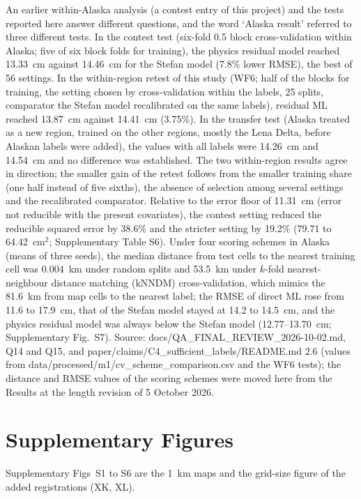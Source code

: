 An earlier within-Alaska analysis (a contest entry of this project) and the tests reported here answer different questions, and the word `Alaska result' referred to three different tests. In the contest test (six-fold 0.5\textdegree{} block cross-validation within Alaska; five of six block folds for training), the physics residual model reached 13.33~cm against 14.46~cm for the Stefan model (7.8\% lower RMSE), the best of 56 settings. In the within-region retest of this study (WF6; half of the blocks for training, the setting chosen by cross-validation within the labels, 25 splits, comparator the Stefan model recalibrated on the same labels), residual ML reached 13.87~cm against 14.41~cm (3.75\%). In the transfer test (Alaska treated as a new region, trained on the other regions, mostly the Lena Delta, before Alaskan labels were added), the values with all labels were 14.26~cm and 14.54~cm and no difference was established. The two within-region results agree in direction; the smaller gain of the retest follows from the smaller training share (one half instead of five sixths), the absence of selection among several settings and the recalibrated comparator. Relative to the error floor of 11.31~cm (error not reducible with the present covariates), the contest setting reduced the reducible squared error by 38.6\% and the stricter setting by 19.2\% (79.71 to 64.42~cm$^2$; Supplementary Table S6). Under four scoring schemes in Alaska (means of three seeds), the median distance from test cells to the nearest training cell was 0.004~km under random splits and 53.5~km under $k$-fold nearest-neighbour distance matching (kNNDM) cross-validation, which mimics the 81.6~km from map cells to the nearest label; the RMSE of direct ML rose from 11.6 to 17.9~cm, that of the Stefan model stayed at 14.2 to 14.5~cm, and the physics residual model was always below the Stefan model (12.77--13.70~cm; Supplementary Fig.~S7). Source: docs/QA\_FINAL\_REVIEW\_2026-10-02.md, Q14 and Q15, and paper/claims/C4\_sufficient\_labels/README.md 2.6 (values from data/processed/m1/cv\_scheme\_comparison.csv and the WF6 tests); the distance and RMSE values of the scoring schemes were moved here from the Results at the length revision of 5 October 2026.

\clearpage


\clearpage
\section*{Supplementary Figures}

Supplementary Figs~S1 to S6 are the 1~km maps and the grid-size figure of the added registrations (XK, XL). 






